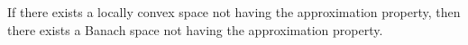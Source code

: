 If there exists a locally convex space not having the approximation property, then there exists a Banach space not having the approximation property.
